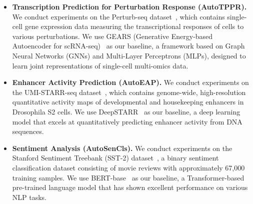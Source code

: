 \begin{itemize}
    \item  \textbf{Transcription Prediction for Perturbation Response (AutoTPPR).} We conduct experiments on the Perturb-seq dataset~\citep{norman2019exploring}, which contains single-cell gene expression data measuring the transcriptional responses of cells to various perturbations.  We use GEARS (Generative Energy-based Autoencoder for scRNA-seq)~\citep{roohani2024predicting} as our baseline, a framework based on Graph Neural Networks (GNNs) and Multi-Layer Perceptrons (MLPs), designed to learn joint representations of single-cell multi-omics data.
    \item \textbf{Enhancer Activity Prediction (AutoEAP).} We conduct experiments on the UMI-STARR-seq dataset~\citep{arnold2013genome}, which contains genome-wide, high-resolution quantitative activity maps of developmental and housekeeping enhancers in Drosophila S2 cells. We use DeepSTARR~\citep{de2022deepstarr} as our baseline, a deep learning model that excels at quantitatively predicting enhancer activity from DNA sequences.
    \item \textbf{Sentiment Analysis (AutoSenCls).} We conduct experiments on the Stanford Sentiment Treebank (SST-2) dataset~\citep{socher2013recursive}, a binary sentiment classification dataset consisting of movie reviews with approximately 67,000 training samples. We use BERT-base~\citep{devlin2019bert} as our baseline, a Transformer-based pre-trained language model that has shown excellent performance on various NLP tasks.  


\end{itemize}
